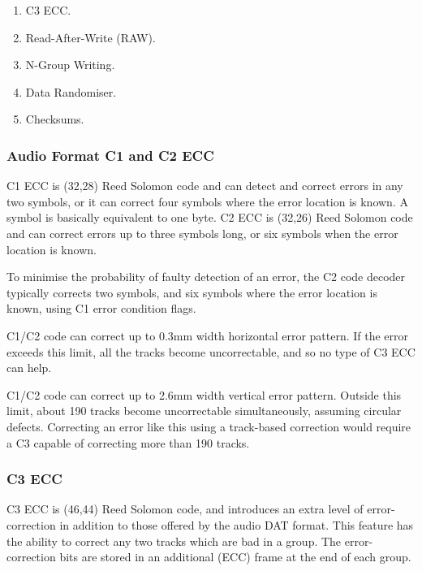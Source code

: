 \documentclass[11pt]{article}
\begin{document}
\begin {enumerate}

\item C3 ECC.

\item Read-After-Write (RAW).

\item N-Group Writing.

\item Data Randomiser.

\item Checksums.

\end {enumerate}

\subsubsection {Audio Format C1 and C2 ECC}

C1 ECC is (32,28) Reed Solomon code and can detect and correct errors in any
two symbols, or it can correct four symbols where the error location is
known. A symbol is basically equivalent to one byte. C2 ECC is (32,26) Reed
Solomon code and can correct errors up to three symbols long, or six symbols
when the error location is known.

To minimise the probability of faulty detection of an error, the C2 code
decoder typically corrects two symbols, and six symbols where the error
location is known, using C1 error condition flags.

C1/C2 code can correct up to 0.3mm width horizontal error pattern. If the
error exceeds this limit, all the tracks become uncorrectable, and so no
type of C3 ECC can help.

C1/C2 code can correct up to 2.6mm width vertical error pattern. Outside
this limit, about 190 tracks become uncorrectable simultaneously, assuming
circular defects. Correcting an error like this using a track-based
correction would require a C3 capable of correcting more than 190 tracks.

\subsubsection {C3 ECC}

C3 ECC is (46,44) Reed Solomon code, and introduces an extra level of
error-correction in addition to those offered by the audio DAT format. This
feature has the ability to correct any two tracks which are bad in a group.
The error-correction bits are stored in an additional (ECC) frame at the end
of each group.
\end{document}
